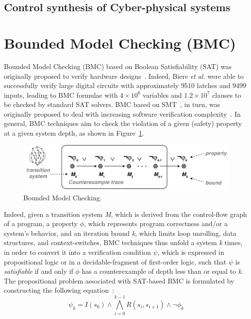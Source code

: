 \documentclass[format=acmsmall, review=false, screen=true]{acmart}
\begin{document}
\subsection{Control synthesis of Cyber-physical systems}
\label{ssec:synthesis}


\section{Bounded Model Checking (BMC)}
\label{Preliminaries}

Bounded Model Checking (BMC) based on Boolean Satisfiability (SAT) was originally proposed to verify hardware designs~\cite{Biere99,handbook09}. Indeed, Biere {\it et al.} were able to successfully verify large digital circuits with approximately $9510$ latches and $9499$ inputs, leading to BMC formulae with $4 \times 10^6$ variables and $1.2 \times 10^7$ clauses to be checked by standard SAT solvers. BMC based on SMT~\cite{BarrettSST09}, in turn, was originally proposed to deal with increasing software verification complexity~\cite{Armando2009}. 
%
In general, BMC techniques aim to check the violation of a given (safety) property at a given system depth, as shown in Figure~\ref{bounded-model-checking}. 
%
\begin{figure}[h]
	\centering
	\includegraphics[scale=0.5]{figure2.jpg}
	\caption{Bounded Model Checking.}
	\label{bounded-model-checking}
\end{figure}

Indeed, given a transition system \textit{M}, which is derived from the control-flow graph of a program, a property $\phi$, which represents program correctness and/or a system's behavior, and an iteration bound \textit{k}, which limits loop unrolling, data structures, and context-switches, BMC techniques thus unfold a system \textit{k} times, in order to convert it into a verification condition $\psi$, which is expressed in propositional logic or in a decidable-fragment of first-order logic, such that $\psi$ is \textit{satisfiable} if and only if $\phi$ has a counterexample of depth less than or equal to \textit{k}. The propositional problem associated with SAT-based BMC is formulated by constructing the following equation~\cite{Biere99}:
%
\begin{equation}
\label{bounded-model-checking-biere}
\psi_{k} = I\left(s_{0}\right) \wedge \bigwedge^{k-1}_{i=0} R\left(s_{i},s_{i+1}\right) \wedge \neg \phi_{k}
\end{equation}
\end{document}
